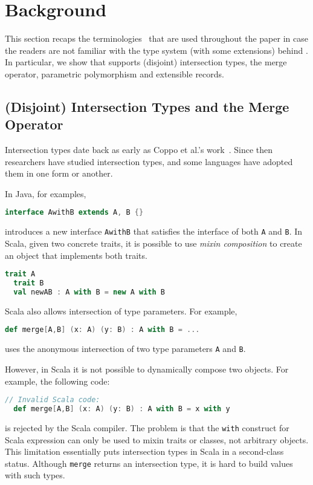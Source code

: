 
\section{Background}
\label{sec:background}

This section recaps the terminologies~\cite{oliveira2016disjoint,
  alpuimdisjoint} that are used throughout the paper in case the readers are not
familiar with the type system (\bname with some extensions) behind \name. In
particular, we show that \name supports (disjoint) intersection types, the merge
operator, parametric polymorphism and extensible records.

\subsection{(Disjoint) Intersection Types and the Merge Operator}
\label{sec:intersection}

Intersection types date back as early as Coppo et al.'s
work~\cite{coppo1981functional}. Since then researchers have studied
intersection types, and some languages have adopted them in one form or another.

In Java, for examples,
\begin{lstlisting}[language=java]
  interface AwithB extends A, B {}
\end{lstlisting}
introduces a new interface \lstinline$AwithB$ that satisfies the interface of
both \lstinline{A} and \lstinline{B}. In Scala, given two concrete traits, it is
possible to use \textit{mixin composition} to create an object that implements
both traits.
\begin{lstlisting}[language=scala]
  trait A
  trait B
  val newAB : A with B = new A with B
\end{lstlisting}
Scala also allows intersection of type parameters. For example,
\begin{lstlisting}[language=scala]
  def merge[A,B] (x: A) (y: B) : A with B = ...
\end{lstlisting}
uses the anonymous intersection of two type parameters \lstinline{A} and
\lstinline{B}.

However, in Scala it is not possible to dynamically compose two objects. For
example, the following code:
\begin{lstlisting}[language=scala]
  // Invalid Scala code:
  def merge[A,B] (x: A) (y: B) : A with B = x with y
\end{lstlisting}
is rejected by the Scala compiler. The problem is that the \lstinline$with$
construct for Scala expression can only be used to mixin traits or classes, not
arbitrary objects. This limitation essentially puts intersection types in Scala
in a second-class status. Although \lstinline{merge} returns an intersection
type, it is hard to build values with such types.

